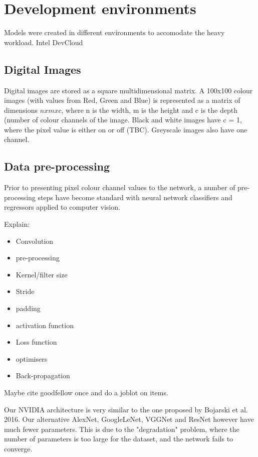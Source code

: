 \section{Development environments}

Models were created in different environments to accomodate the heavy workload. Intel DevCloud 

\subsection{Digital Images}
Digital images are stored as a square multidimensional matrix. A 100x100 colour images (with values from Red, Green and Blue) is represented as a matrix of dimensions $n x m x c$, where n is the width, m is the height and c is the depth (number of colour channels of the image. Black and white images have c = 1, where the pixel value is either on or off (TBC). Greyscale images also have one channel.

\subsection{Data pre-processing}
Prior to presenting pixel colour channel values to the network, a number of pre-processing steps have become standard with neural network classifiers and regressors applied to computer vision.


Explain:  
\begin{itemize}
    \item Convolution
    \item pre-processing
    \item Kernel/filter size
    \item Stride
    \item padding
    \item activation function
    \item Loss function
    \item optimisers
    \item Back-propagation
\end{itemize}

Maybe cite goodfellow once and do a joblot on items.  

Our NVIDIA architecture is very similar to the one proposed by Bojarski et al. 2016. Our alternative AlexNet, GoogleLeNet, VGGNet and ResNet however have much fewer parameters. This is due to the "degradation" problem, where the number of parameters is too large for the dataset, and the network fails to converge.


